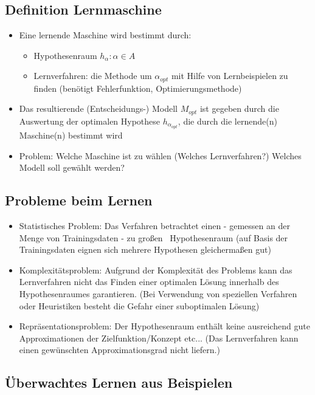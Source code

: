 \documentclass[paper=a4, fontsize=11pt]{scrartcl} %
\numberwithin{equation}{section} %
\numberwithin{figure}{section} %
\numberwithin{table}{section} %
\begin{document}
\subsection{Definition Lernmaschine}

\begin{itemize}
\item Eine lernende Maschine wird bestimmt durch:
\begin{itemize}
\item Hypothesenraum {$h_\alpha : \alpha \in A$}
\item Lernverfahren: die Methode um $\alpha_{opt}$ mit Hilfe von Lernbeispielen zu finden (benötigt Fehlerfunktion, Optimierungsmethode)
\end{itemize}
\item Das resultierende (Entscheidungs-) Modell $M_{opt}$ ist gegeben durch die Auswertung der optimalen Hypothese $h_{\alpha_{opt}}$, die durch die lernende(n) Maschine(n) bestimmt wird
\item Problem: Welche Maschine ist zu wählen (Welches Lernverfahren?) Welches Modell soll gewählt werden?
\end{itemize}

\subsection{Probleme beim Lernen}

\begin{itemize}
\item Statistisches Problem: Das Verfahren betrachtet einen - gemessen an der Menge von Trainingsdaten - \glqq zu großen \grqq\ Hypothesenraum (auf Basis der Trainingsdaten eignen sich mehrere Hypothesen gleichermaßen gut)
\item Komplexitätsproblem: Aufgrund der Komplexität des Problems kann das Lernverfahren nicht das Finden einer optimalen Lösung innerhalb des Hypothesenraumes garantieren. (Bei Verwendung von speziellen Verfahren oder Heuristiken besteht die Gefahr einer suboptimalen Lösung)
\item Repräsentationsproblem: Der Hypothesenraum enthält keine ausreichend gute Approximationen der Zielfunktion/Konzept etc... (Das Lernverfahren kann einen gewünschten Approximationsgrad nicht liefern.)
\end{itemize}

\subsection{Überwachtes Lernen aus Beispielen}
\end{document}
